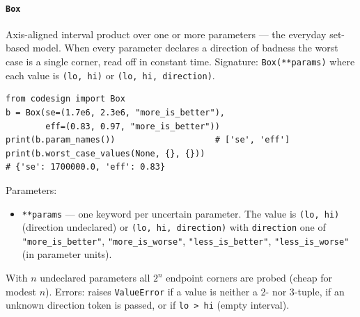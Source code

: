 \documentclass[11pt,a4paper]{article}
\begin{document}
\paragraph{\texttt{Box}}\label{ref:uncertainty:box}
Axis-aligned interval product over one or more parameters --- the everyday
set-based model. When every parameter declares a direction of badness the
worst case is a single corner, read off in constant time.
Signature: \texttt{Box(**params)} where each value is \texttt{(lo, hi)} or
\texttt{(lo, hi, direction)}.
\begin{lstlisting}
from codesign import Box
b = Box(se=(1.7e6, 2.3e6, "more_is_better"),
        eff=(0.83, 0.97, "more_is_better"))
print(b.param_names())                    # ['se', 'eff']
print(b.worst_case_values(None, {}, {}))
# {'se': 1700000.0, 'eff': 0.83}
\end{lstlisting}
Parameters:
\begin{itemize}[nosep]
  \item \texttt{**params} --- one keyword per uncertain parameter. The value
    is \texttt{(lo, hi)} (direction undeclared) or \texttt{(lo, hi, direction)}
    with \texttt{direction} one of \texttt{"more\_is\_better"},
    \texttt{"more\_is\_worse"}, \texttt{"less\_is\_better"},
    \texttt{"less\_is\_worse"} (in parameter units).
\end{itemize}
With $n$ undeclared parameters all $2^n$ endpoint corners are probed
(cheap for modest $n$). Errors: raises \texttt{ValueError} if a value is
neither a 2- nor 3-tuple, if an unknown direction token is passed, or if
\texttt{lo > hi} (empty interval).
\end{document}
